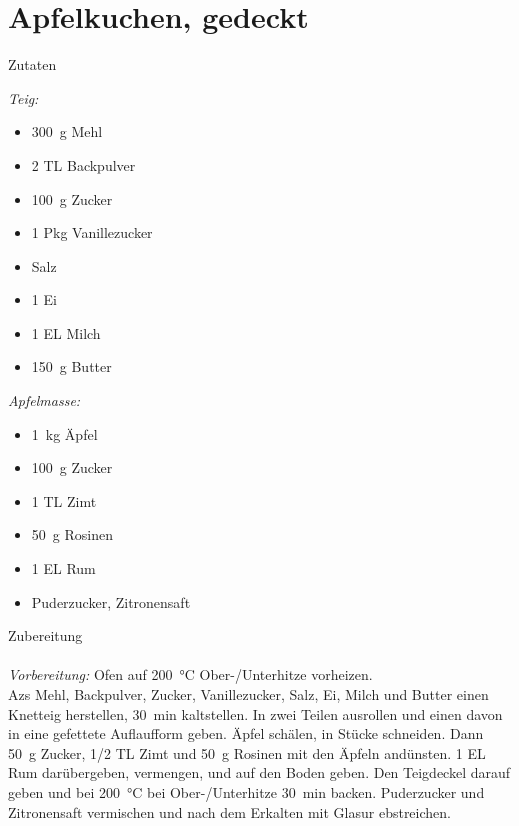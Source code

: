 \section*{Apfelkuchen, gedeckt}
\ihead{}\ohead{}
\cfoot{}
{\Large Zutaten}
\begin{multicols}{2}
\textit{Teig:}
\begin{itemize}
    \item \SI{300}{g} Mehl
    \item \num{2} TL Backpulver
    \item \SI{100}{g} Zucker
    \item \num{1} Pkg Vanillezucker
    \item Salz
    \item \num{1} Ei
    \item \num{1} EL Milch
    \item \SI{150}{g} Butter
\end{itemize}
\textit{Apfelmasse:}
\begin{itemize}
    \item \SI{1}{kg} Äpfel
    \item \SI{100}{g} Zucker
    \item \num{1} TL Zimt
    \item \SI{50}{g} Rosinen
    \item \num{1} EL Rum
    \item Puderzucker, Zitronensaft
\end{itemize}
\end{multicols}
\noindent
{\Large Zubereitung}\\
\\
\textit{Vorbereitung:} Ofen auf \SI{200}{\celsius} Ober-/Unterhitze vorheizen.\\
Azs Mehl, Backpulver, Zucker, Vanillezucker, Salz, Ei, Milch und Butter einen Knetteig herstellen, \SI{30}{min} kaltstellen.
In zwei Teilen ausrollen und einen davon in eine gefettete Auflaufform geben.
Äpfel schälen, in Stücke schneiden. 
Dann \SI{50}{g} Zucker, \num{1/2} TL Zimt und \SI{50}{g} Rosinen mit den Äpfeln andünsten.
\num{1} EL Rum darübergeben, vermengen, und auf den Boden geben.
Den Teigdeckel darauf geben und bei \SI{200}{\celsius} bei Ober-/Unterhitze \SI{30}{min} backen.
Puderzucker und Zitronensaft vermischen und nach dem Erkalten mit Glasur ebstreichen. 